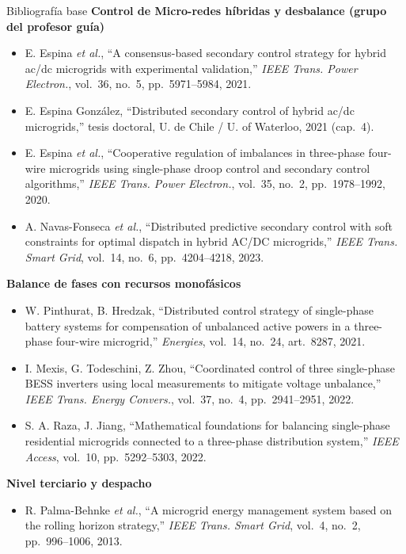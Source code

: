 \documentclass[aspectratio=169,10pt,t]{beamer}
\begin{document}
\begin{frame}{Bibliografía base}
  \fontsize{5.9}{6.9}\selectfont
  \textbf{\color{usachT}Control de Micro-redes híbridas y desbalance (grupo del profesor guía)}
  \begin{itemize}\setlength\itemsep{0.5pt}
    \item[{[1]}] E. Espina \emph{et al.}, ``A consensus-based secondary control strategy for hybrid ac/dc microgrids with experimental validation,'' \emph{IEEE Trans. Power Electron.}, vol.~36, no.~5, pp.~5971--5984, 2021.
    \item[{[2]}] E. Espina González, ``Distributed secondary control of hybrid ac/dc microgrids,'' tesis doctoral, U. de Chile / U. of Waterloo, 2021 (cap.~4).
    \item[{[3]}] E. Espina \emph{et al.}, ``Cooperative regulation of imbalances in three-phase four-wire microgrids using single-phase droop control and secondary control algorithms,'' \emph{IEEE Trans. Power Electron.}, vol.~35, no.~2, pp.~1978--1992, 2020.
    \item[{[4]}] A. Navas-Fonseca \emph{et al.}, ``Distributed predictive secondary control with soft constraints for optimal dispatch in hybrid AC/DC microgrids,'' \emph{IEEE Trans. Smart Grid}, vol.~14, no.~6, pp.~4204--4218, 2023.
  \end{itemize}
  \textbf{\color{usachT}Balance de fases con recursos monofásicos}
  \begin{itemize}\setlength\itemsep{0.5pt}
    \item[{[5]}] W. Pinthurat, B. Hredzak, ``Distributed control strategy of single-phase battery systems for compensation of unbalanced active powers in a three-phase four-wire microgrid,'' \emph{Energies}, vol.~14, no.~24, art.~8287, 2021.
    \item[{[6]}] I. Mexis, G. Todeschini, Z. Zhou, ``Coordinated control of three single-phase BESS inverters using local measurements to mitigate voltage unbalance,'' \emph{IEEE Trans. Energy Convers.}, vol.~37, no.~4, pp.~2941--2951, 2022.
    \item[{[7]}] S. A. Raza, J. Jiang, ``Mathematical foundations for balancing single-phase residential microgrids connected to a three-phase distribution system,'' \emph{IEEE Access}, vol.~10, pp.~5292--5303, 2022.
  \end{itemize}
  \textbf{\color{usachT}Nivel terciario y despacho}
  \begin{itemize}\setlength\itemsep{0.5pt}
    \item[{[8]}] R. Palma-Behnke \emph{et al.}, ``A microgrid energy management system based on the rolling horizon strategy,'' \emph{IEEE Trans. Smart Grid}, vol.~4, no.~2, pp.~996--1006, 2013.

\end{itemize}
\end{frame}
\end{document}
